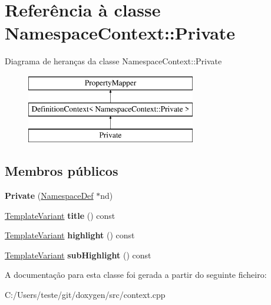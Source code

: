 \hypertarget{class_namespace_context_1_1_private}{\section{Referência à classe Namespace\-Context\-:\-:Private}
\label{class_namespace_context_1_1_private}
}
Diagrama de heranças da classe Namespace\-Context\-:\-:Private\begin{figure}[H]
\begin{center}
\leavevmode
\includegraphics[height=3.000000cm]{class_namespace_context_1_1_private}
\end{center}
\end{figure}
\subsection*{Membros públicos}
\begin{DoxyCompactItemize}
\item 
\hypertarget{class_namespace_context_1_1_private_a63ab016a9a0ef85b1deab7d92f73009a}{{\bfseries Private} (\hyperlink{class_namespace_def}{Namespace\-Def} $\ast$nd)}\label{class_namespace_context_1_1_private_a63ab016a9a0ef85b1deab7d92f73009a}

\item 
\hypertarget{class_namespace_context_1_1_private_a5732df72750a31555da8a10f5788ef02}{\hyperlink{class_template_variant}{Template\-Variant} {\bfseries title} () const }\label{class_namespace_context_1_1_private_a5732df72750a31555da8a10f5788ef02}

\item 
\hypertarget{class_namespace_context_1_1_private_ab088f4d955499ca1d67c286a117e5bfe}{\hyperlink{class_template_variant}{Template\-Variant} {\bfseries highlight} () const }\label{class_namespace_context_1_1_private_ab088f4d955499ca1d67c286a117e5bfe}

\item 
\hypertarget{class_namespace_context_1_1_private_a07fdcdf7a4c2a31c3ca0c5ffea8b6a9e}{\hyperlink{class_template_variant}{Template\-Variant} {\bfseries sub\-Highlight} () const }\label{class_namespace_context_1_1_private_a07fdcdf7a4c2a31c3ca0c5ffea8b6a9e}

\end{DoxyCompactItemize}


A documentação para esta classe foi gerada a partir do seguinte ficheiro\-:\begin{DoxyCompactItemize}
\item 
C\-:/\-Users/teste/git/doxygen/src/context.\-cpp\end{DoxyCompactItemize}
